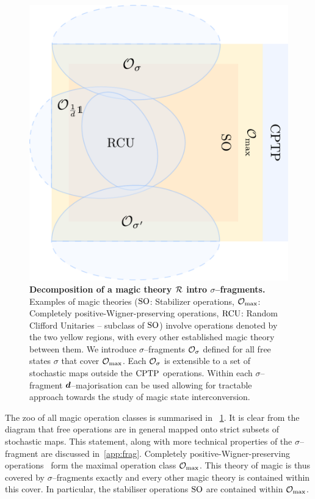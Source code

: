 \documentclass[pra,
aps,
twocolumn,
superscriptaddress,
groupedaddress,
nofootinbib,
reprint
]{revtex4-1}
\begin{document}
\begin{figure}[t]
    \centering
        \includegraphics[scale=0.3
        ]{figs/operations.pdf}
    \caption{\textbf{Decomposition of a magic theory $\mathcal{R}$ intro $\sigma$--fragments.} 
	Examples of magic theories (${\rm{SO}}$: Stabilizer operations, $\mathcal{O}_{\rm{max}}$: Completely positive-Wigner-preserving operations, ${\rm{RCU}}$: Random Clifford Unitaries -- subclass of ${\rm{SO}}$) involve operations denoted by the two yellow regions, with every other established magic theory  between them.
    We introduce $\sigma$--fragments $\mathcal{O}_\sigma$ defined for all free states $\sigma$ that cover $\mathcal{O}_{\rm{max}}$. 
    Each $\mathcal{O}_\sigma$ is extensible to a set of stochastic maps outside the ${\rm{CPTP}}$ operations.
    Within each $\sigma$--fragment $\bm{d}$--majorisation can be used allowing for tractable approach towards the study of magic state interconversion.
    }
    \label{fig:zoo}
\end{figure}

The zoo of all magic operation classes is summarised in ~\cref{fig:zoo}.
It is clear from the diagram that free operations are in general mapped onto strict subsets of stochastic maps.
This statement, along with more technical properties of the $\sigma$--fragment are discussed in~\cref{app:frag}.
Completely positive-Wigner-preserving operations~\cite{Wang_2019} form the maximal operation class $\mathcal{O}_{\rm{max}}$.
This theory of magic is thus covered by $\sigma$--fragments exactly and every other magic theory is contained within this cover.
In particular, the stabiliser operations ${\rm{SO}}$ are contained within $\mathcal{O}_{\rm{max}}$.
\end{document}
